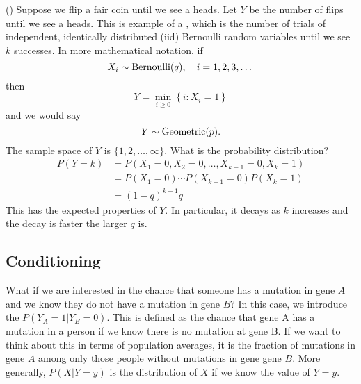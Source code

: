 \begin{example}(\cite[Example 2.3.4]{evans})
Suppose we flip a fair coin until we see a heads. Let $Y$ be the number of flips until we see a heads. This is example of a  , which is the number of trials of independent, identically distributed (iid) Bernoulli random variables until we see $k$ successes. In more mathematical notation, if
\begin{equation*}
X_i \sim {\rm Bernoulli}(q), \quad i = 1,2,3,\dots
\end{equation*}
then 
\begin{equation*}
Y = \min_{i\ge0}\left\{i:X_i=1 \right\}
\end{equation*} 
and we would say 
\begin{equation*}
Y \sim {\rm Geometric}(p).
\end{equation*}
The sample space of $Y$ is $\{1,2,\dots,\infty\}$. What is the probability distribution? 
\begin{align*}
P(Y=k) &= P(X_1=0,X_2=0,\dots,X_{k-1}=0,X_k=1) \\
&= P(X_1 = 0) \cdots  P(X_{k-1}=0)P(X_k=1) \\
&= (1-q)^{k-1}q
\end{align*}
This has the expected properties of $Y$. In particular, it decays as $k$ increases and the decay is faster the larger $q$ is. 

\end{example}






\subsection{Conditioning}
 What if we are interested in the chance that someone has a mutation in gene $A$ and we know they do not have a mutation in gene $B$?  In this case, we introduce the  $P(Y_A=1|Y_B=0)$. This is defined as the chance that gene A has a mutation in a person if we know there is no mutation at gene B. If we want to think about this in terms of population averages, it is the fraction of mutations in gene $A$ among only those people without mutations in gene gene $B$. 
 More generally, $P(X|Y=y)$ is the distribution of $X$ if we know the value of $Y=y$. 
 
